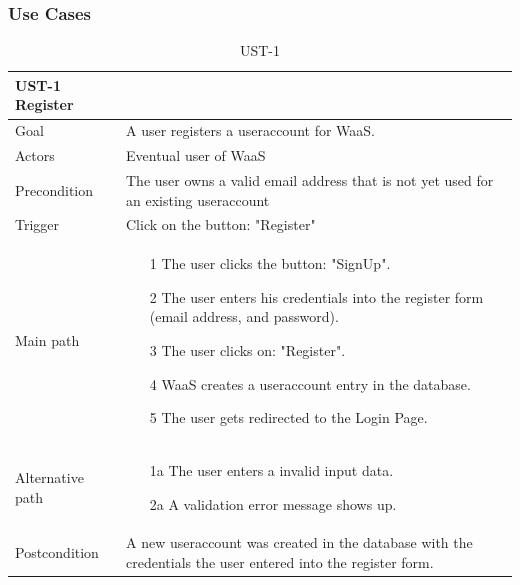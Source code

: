 \documentclass[titlepage, 12pt]{article}
\begin{document}
\subsubsection{{Use Cases}}

\begin{table}[H]
  \begin{center}

    \begin{tabular}{p{4cm}|p{10cm}}
      \textbf{UST-1 Register}                                                                                                        \\
      \hline
      Goal             & A user registers a useraccount for WaaS.                                                                    \\
      \hline
      Actors           & Eventual user of WaaS                                                                                       \\
      \hline
      Precondition     & The user owns a valid email address that is not yet used for an existing useraccount                        \\
      \hline
      Trigger          & Click on the button: "Register"                                                                             \\
      \hline
      Main path        &
      \begin{itemize}
        \item [1] The user clicks the button: "SignUp".
        \item [2] The user enters his credentials into the register form (email address, and password).
        \item [3] The user clicks on: "Register".
        \item [4] WaaS creates a useraccount entry in the database.
        \item [5] The user gets redirected to the Login Page.
      \end{itemize}                                                                                                      \\
      \hline
      Alternative path &
      \begin{itemize}
        \item [1a] The user enters a invalid input data.
        \item [2a] A validation error message shows up.
      \end{itemize}                                                                                                      \\
      \hline
      Postcondition    & A new useraccount was created in the database with the credentials the user entered into the register form. \\
    \end{tabular}

    \caption{UST-1}
    \label{table:UST-1}

  \end{center}
\end{table}
\end{document}
